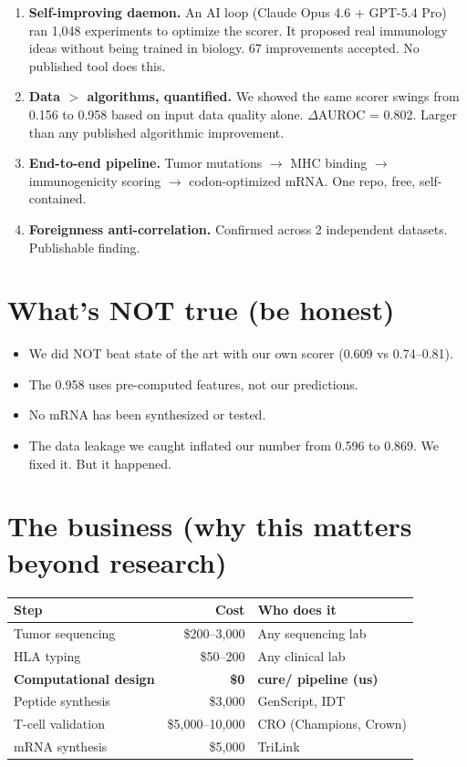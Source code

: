 \documentclass[12pt]{article}
\begin{document}
\begin{enumerate}[leftmargin=*,itemsep=4pt]
\item \textbf{Self-improving daemon.} An AI loop (Claude Opus 4.6 + GPT-5.4 Pro) ran 1,048 experiments to optimize the scorer. It proposed real immunology ideas without being trained in biology. 67 improvements accepted. No published tool does this.
\item \textbf{Data $>$ algorithms, quantified.} We showed the same scorer swings from 0.156 to 0.958 based on input data quality alone. $\Delta$AUROC = 0.802. Larger than any published algorithmic improvement.
\item \textbf{End-to-end pipeline.} Tumor mutations $\to$ MHC binding $\to$ immunogenicity scoring $\to$ codon-optimized mRNA. One repo, free, self-contained.
\item \textbf{Foreignness anti-correlation.} Confirmed across 2 independent datasets. Publishable finding.
\end{enumerate}

\section*{What's NOT true (be honest)}

\begin{itemize}[leftmargin=*,itemsep=2pt]
\item We did NOT beat state of the art with our own scorer (0.609 vs 0.74--0.81).
\item The 0.958 uses pre-computed features, not our predictions.
\item No mRNA has been synthesized or tested.
\item The data leakage we caught inflated our number from 0.596 to 0.869. We fixed it. But it happened.
\end{itemize}

\section*{The business (why this matters beyond research)}

\begin{center}
\small
\begin{tabular}{lrl}
\toprule
Step & Cost & Who does it \\
\midrule
Tumor sequencing & \$200--3,000 & Any sequencing lab \\
HLA typing & \$50--200 & Any clinical lab \\
\textbf{Computational design} & \textbf{\$0} & \textbf{cure/ pipeline (us)} \\
Peptide synthesis & \$3,000 & GenScript, IDT \\
T-cell validation & \$5,000--10,000 & CRO (Champions, Crown) \\
mRNA synthesis & \$5,000 & TriLink \\
\bottomrule
\end{tabular}
\end{center}
\end{document}
